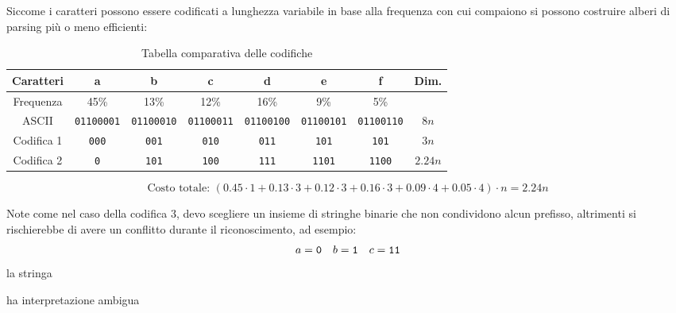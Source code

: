 \vskip3mm
Siccome i caratteri possono essere codificati a lunghezza variabile in base alla frequenza con cui compaiono si possono costruire alberi di parsing più o meno efficienti:
\begin{table}[H]
	\centering
	\begin{tabular}{cccccccc}
		\toprule
		Caratteri  & a                               & b                                & c                                & d                                & e                                & f                                & Dim.    \\
		\midrule
		Frequenza  & 45\%                            & 13\%                             & 12\%                             & 16\%                             & 9\%                              & 5\%                              &         \\
		ASCII      & \footnotesize \texttt{01100001} & \footnotesize  \texttt{01100010} & \footnotesize  \texttt{01100011} & \footnotesize  \texttt{01100100} & \footnotesize  \texttt{01100101} & \footnotesize  \texttt{01100110} & $8n$    \\
		Codifica 1 & \footnotesize \texttt{000}      & \footnotesize \texttt{001}       & \footnotesize\texttt{010}        & \footnotesize \texttt{011}       & \footnotesize\texttt{101}        & \footnotesize \texttt{101}       & $3n$    \\
		Codifica 2 & \footnotesize \texttt{0}        & \footnotesize \texttt{101}       & \footnotesize\texttt{100}        & \footnotesize \texttt{111}       & \footnotesize\texttt{1101}       & \footnotesize \texttt{1100}      & $2.24n$ \\
		\bottomrule
	\end{tabular}
	\caption{Tabella comparativa delle codifiche}
\end{table}
\[
	\text{Costo totale: } (0.45 \cdot 1 + 0.13 \cdot 3 + 0.12 \cdot 3 + 0.16 \cdot 3 + 0.09 \cdot 4 + 0.05 \cdot 4) \cdot n = 2.24n
\]

Note come nel caso della codifica $ 3 $, devo scegliere un insieme di stringhe binarie che non condividono alcun prefisso, altrimenti si rischierebbe di avere un conflitto durante il riconoscimento, ad esempio:
\[
	a = \text{\ttfamily 0} \quad
	b = \text{\ttfamily 1} \quad
	c = \text{\ttfamily 11}
\]
la stringa
\begin{center}
\end{center}
ha interpretazione ambigua




